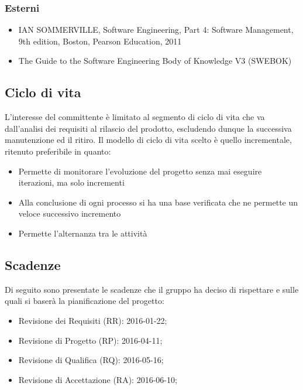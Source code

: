 \subsubsection{Esterni}
\begin{itemize}
\item IAN SOMMERVILLE, Software Engineering, Part 4: Software Management, 9th edition, Boston, Pearson Education, 2011
\item The Guide to the Software Engineering Body of Knowledge V3 (SWEBOK)
\end{itemize}

\subsection{Ciclo di vita}
L’interesse del committente è limitato al segmento di ciclo di vita che va dall’analisi dei requisiti al
rilascio del prodotto, escludendo dunque la successiva manutenzione ed il ritiro. Il modello di ciclo di
vita scelto \`e quello incrementale, ritenuto preferibile in quanto:
\begin{itemize}
\item Permette di monitorare l'evoluzione del progetto senza mai eseguire iterazioni, ma solo incrementi
\item Alla conclusione di ogni processo si ha una base verificata che ne permette un veloce successivo incremento
\item Permette l'alternanza tra le attivit\`a
\end{itemize}

\subsection{Scadenze}
Di seguito sono presentate le scadenze che il gruppo ha deciso di rispettare e sulle quali si baserà la pianificazione del progetto:
\begin{itemize}
\item Revisione dei Requisiti (RR): 2016-01-22;
\item Revisione di Progetto (RP): 2016-04-11;
\item Revisione di Qualifica (RQ): 2016-05-16;
\item Revisione di Accettazione (RA): 2016-06-10;
\end{itemize}


